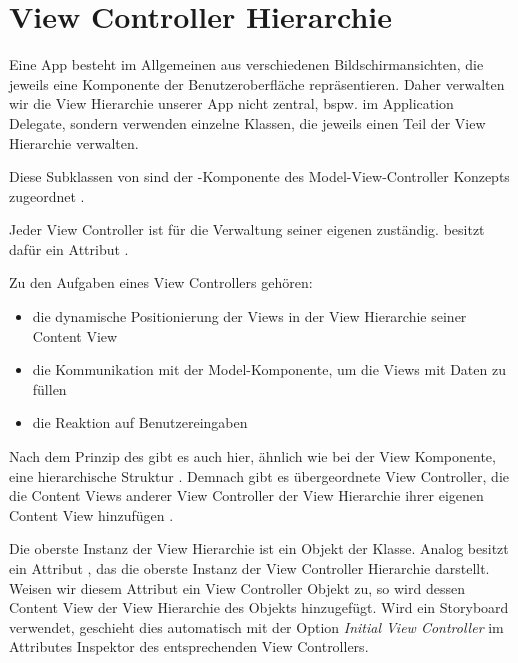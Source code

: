 \documentclass[parskip=half, final]{scrreprt}
\begin{document}
\section{View Controller Hierarchie}

\mvcindicatorcontroller

Eine App besteht im Allgemeinen aus verschiedenen Bildschirmansichten, die jeweils eine Komponente der Benutzeroberfläche repräsentieren. Daher verwalten wir die View Hierarchie unserer App nicht zentral, bspw. im Application Delegate, sondern verwenden einzelne Klassen, die jeweils einen Teil der View Hierarchie verwalten.

Diese Subklassen von  sind der -Komponente des Model-View-Controller Konzepts zugeordnet .

Jeder View Controller ist für die Verwaltung seiner eigenen  zuständig.  besitzt dafür ein Attribut .

Zu den Aufgaben eines View Controllers gehören:
\begin{itemize}
\item die dynamische Positionierung der Views in der View Hierarchie seiner Content View
\item die Kommunikation mit der Model-Komponente, um die Views mit Daten zu füllen
\item die Reaktion auf Benutzereingaben
\end{itemize}

Nach dem Prinzip des  gibt es auch hier, ähnlich wie bei der View Komponente, eine hierarchische Struktur . Demnach gibt es übergeordnete View Controller, die die Content Views anderer View Controller der View Hierarchie ihrer eigenen Content View hinzufügen .

\clearpage
{}

Die oberste Instanz der View Hierarchie ist ein Objekt der  Klasse. Analog besitzt  ein Attribut , das die oberste Instanz der View Controller Hierarchie darstellt. Weisen wir diesem Attribut ein View Controller Objekt zu, so wird dessen Content View der View Hierarchie des  Objekts hinzugefügt. Wird ein Storyboard verwendet, geschieht dies automatisch mit der Option \emph{Initial View Controller} im Attributes Inspektor des entsprechenden View Controllers.
\end{document}
